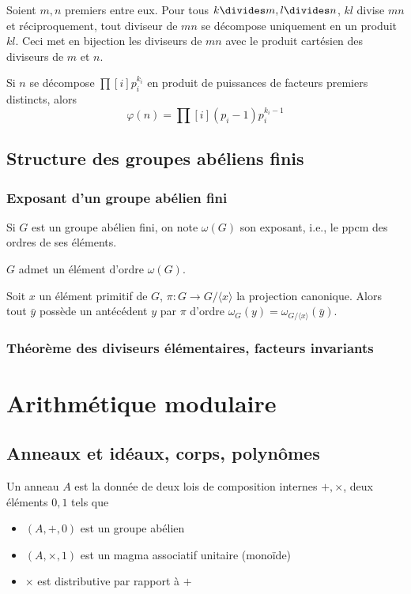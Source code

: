 \documentclass[a4paper,11pt,twocolumn]{article}
\begin{document}
       Soient $m,n$ premiers entre eux. Pour tous $k\divides m, l\divides n$, $kl$ divise $mn$ et réciproquement, tout diviseur de $mn$ se décompose uniquement en un produit $kl$. Ceci met en bijection les diviseurs de $mn$ avec le produit cartésien des diviseurs de $m$ et $n$.

       Si $n$ se décompose $\prod[i]{p_i^{k_i}}$ en produit de puissances de facteurs premiers distincts, alors
      \[\varphi(n) = \prod[i]{(p_i-1)p_i^{k_i-1}}\]

  \subsection{Structure des groupes abéliens finis}

    \subsubsection{Exposant d'un groupe abélien fini}

       Si $G$ est un groupe abélien fini, on note $\omega(G)$ son exposant, i.e., le ppcm des ordres de ses éléments.

       $G$ admet un élément d'ordre $\omega(G)$.

       Soit $x$ un élément primitif de $G$, $π:G\rightarrow G/\langle x\rangle$ la projection canonique. Alors tout $\bar{y}$ possède un antécédent $y$ par $\pi$ d'ordre $\omega_G(y)=\omega_{G/\langle x\rangle}(\bar{y})$.

    \subsubsection{Théorème des diviseurs élémentaires, facteurs invariants}


\section{Arithmétique modulaire}

  \subsection{Anneaux et idéaux, corps, polynômes}

     Un anneau $A$ est la donnée de deux lois de composition internes $+,\times$, deux éléments $0,1$ tels que
    \begin{itemize}
      \item $(A,+,0)$ est un groupe abélien
      \item $(A,\times,1)$ est un magma associatif unitaire (monoïde)
      \item $\times$ est distributive par rapport à $+$
    \end{itemize}
\end{document}
